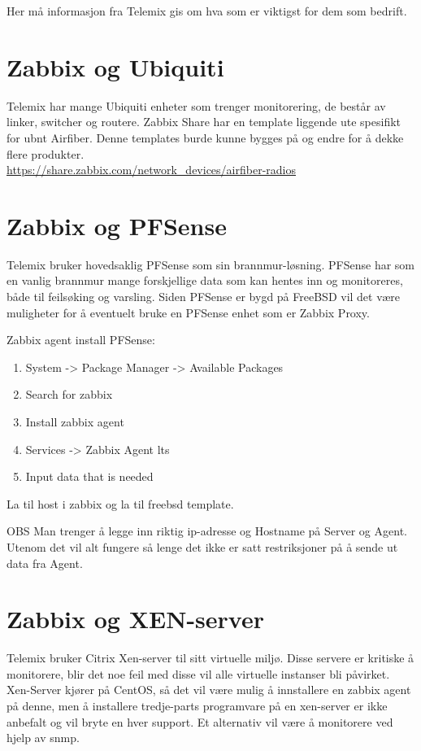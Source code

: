 Her må informasjon fra Telemix gis om hva som er viktigst for dem som bedrift. 

\section{Zabbix og Ubiquiti}
Telemix har mange Ubiquiti enheter som trenger monitorering, de består av linker, switcher og routere. 
Zabbix Share har en template liggende ute spesifikt for \gls{ubnt} Airfiber. Denne templates burde kunne bygges på og endre for å dekke flere produkter.
\\\url{https://share.zabbix.com/network_devices/airfiber-radios}


\section{Zabbix og PFSense}
Telemix bruker hovedsaklig PFSense som sin brannmur-løsning. PFSense har som en vanlig brannmur mange forskjellige data som kan hentes inn og monitoreres, både til feilsøking og varsling.
Siden PFSense er bygd på FreeBSD vil det være muligheter for å eventuelt bruke en PFSense enhet som er Zabbix Proxy.

Zabbix agent install PFSense:
\begin{enumerate}
    \item System -> Package Manager -> Available Packages
    \item Search for zabbix
    \item Install zabbix agent
    \item Services -> Zabbix Agent \gls{lts}
    \item Input data that is needed
\end{enumerate}


La til host i zabbix og la til freebsd template. 

\begin{tanke}{OBS}
    Man trenger å legge inn riktig ip-adresse og Hostname på Server og Agent. Utenom det vil alt fungere så lenge det ikke er satt restriksjoner på å sende ut data fra Agent.
\end{tanke}


\section{Zabbix og XEN-server}
Telemix bruker Citrix Xen-server til sitt virtuelle miljø. Disse servere er kritiske å monitorere, blir det noe feil med disse vil alle virtuelle instanser bli påvirket.
Xen-Server kjører på CentOS, så det vil være mulig å innstallere en zabbix agent på denne, men å installere tredje-parts programvare på en xen-server er ikke anbefalt og vil bryte en hver support.
Et alternativ vil være å monitorere ved hjelp av \gls{snmp}.



